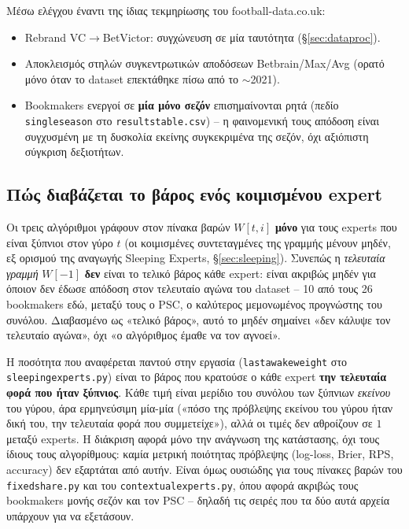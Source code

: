 \documentclass[11pt,a4paper]{article}
\newcommand{\file}[1]{\texttt{#1}}
\newcommand{\var}[1]{\texttt{#1}}
\renewcommand{\_}{\oldunderscore\allowbreak}
\begin{document}
Μέσω ελέγχου έναντι της ίδιας τεκμηρίωσης του football-data.co.uk:
\begin{itemize}
  \item Rebrand VC$\to$BetVictor: συγχώνευση σε μία ταυτότητα (\S\ref{sec:dataproc}).
  \item Αποκλεισμός στηλών συγκεντρωτικών αποδόσεων Betbrain/Max/Avg (ορατό μόνο όταν το
        dataset επεκτάθηκε πίσω από το $\sim$2021).
  \item Bookmakers ενεργοί σε \textbf{μία μόνο σεζόν} επισημαίνονται ρητά (πεδίο
        \var{single\_season} στο \file{results\_table.csv}) -- η φαινομενική τους απόδοση
        είναι συγχυσμένη με τη δυσκολία εκείνης συγκεκριμένα της σεζόν, όχι αξιόπιστη
        σύγκριση δεξιοτήτων.
\end{itemize}

\subsection{Πώς διαβάζεται το βάρος ενός κοιμισμένου expert}
\label{sec:bugfix}

Οι τρεις αλγόριθμοι γράφουν στον πίνακα βαρών $W[t,i]$ \textbf{μόνο} για τους experts που
είναι ξύπνιοι στον γύρο $t$ (οι κοιμισμένες συντεταγμένες της γραμμής μένουν μηδέν, εξ
ορισμού της αναγωγής Sleeping Experts, \S\ref{sec:sleeping}). Συνεπώς η \emph{τελευταία
γραμμή} $W[-1]$ \textbf{δεν} είναι το τελικό βάρος κάθε expert: είναι ακριβώς μηδέν για
όποιον δεν έδωσε απόδοση στον τελευταίο αγώνα του dataset -- 10 από τους 26 bookmakers εδώ,
μεταξύ τους ο PSC, ο καλύτερος μεμονωμένος προγνώστης του συνόλου. Διαβασμένο ως «τελικό
βάρος», αυτό το μηδέν σημαίνει «δεν κάλυψε τον τελευταίο αγώνα», όχι «ο αλγόριθμος έμαθε να
τον αγνοεί».

Η ποσότητα που αναφέρεται παντού στην εργασία (\var{last\_awake\_weight} στο
\file{sleeping\_experts.py}) είναι το βάρος που κρατούσε ο κάθε expert \textbf{την τελευταία
φορά που ήταν ξύπνιος}. Κάθε τιμή είναι μερίδιο του συνόλου των ξύπνιων \emph{εκείνου} του
γύρου, άρα ερμηνεύσιμη μία-μία («πόσο της πρόβλεψης εκείνου του γύρου ήταν δική του, την
τελευταία φορά που συμμετείχε»), αλλά οι τιμές δεν αθροίζουν σε $1$ μεταξύ experts. Η
διάκριση αφορά μόνο την ανάγνωση της κατάστασης, όχι τους ίδιους τους αλγορίθμους: καμία
μετρική ποιότητας πρόβλεψης (log-loss, Brier, RPS, accuracy) δεν εξαρτάται από αυτήν. Είναι
όμως ουσιώδης για τους πίνακες βαρών του \file{fixed\_share.py} και του
\file{contextual\_experts.py}, όπου αφορά ακριβώς τους bookmakers μονής σεζόν και τον PSC --
δηλαδή τις σειρές που τα δύο αυτά αρχεία υπάρχουν για να εξετάσουν.
\end{document}
